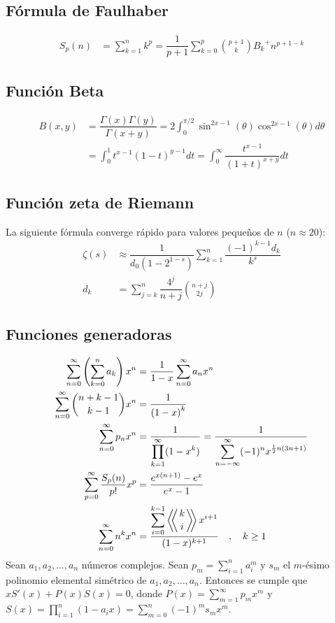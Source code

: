 	\subsection{Fórmula de Faulhaber}
		\begin{align*}
			S_p(n) &= \sum_{k=1}^{n}k^p = \dfrac{1}{p+1}\sum_{k=0}^{p} \binom{p+1}{k} {B_k}^+ n^{p+1-k}
		\end{align*}
	
	\subsection{Función Beta}
		\begin{align*}
			B(x,y) &= \dfrac{\Gamma(x)\Gamma(y)}{\Gamma(x+y)} = 2 \int_{0}^{\pi/2} \sin^{2x-1}(\theta) \cos^{2x-1}(\theta) d\theta \\
			&= \int_{0}^{1} t^{x-1} (1-t)^{y-1} dt = \int_{0}^{\infty} \dfrac{t^{x-1}}{(1+t)^{x+y}} dt
		\end{align*}
		
	\subsection{Función zeta de Riemann}
		La siguiente fórmula converge rápido para valores pequeños de $n$ ($n \approx 20$):
		\begin{align*}
			\zeta(s) &\approx \dfrac{1}{d_0 (1 - 2^{1-s})} \sum_{k=1}^{n} \dfrac{(-1)^{k-1} d_k}{k^s} \\
			d_k &= \sum_{j=k}^{n} \dfrac{4^j}{n+j} \binom{n+j}{2j}
		\end{align*}
	
	\subsection{Funciones generadoras}
		\begin{align*}
			\sum_{n=0}^{\infty} \left( \sum_{k=0}^{n}a_k \right) x^n &= \dfrac{1}{1-x}\sum_{n=0}^{\infty} a_n x^n \\
			\sum_{n=0}^{\infty} \binom{n+k-1}{k-1}x^n &= \dfrac{1}{\left(1-x\right)^k} \\
			\sum_{n=0}^{\infty} p_n x^n &= \dfrac{1}{\displaystyle \prod_{k=1}^{\infty}(1-x^k)} = \dfrac{1}{\displaystyle \sum_{n=-\infty}^{\infty} (-1)^n x^{\frac{1}{2}n(3n+1)}} \\
			\sum_{p=0}^{\infty} \dfrac{S_p(n)}{p!} x^p &= \dfrac{e^{x(n+1)}-e^x}{e^x-1} \\
			\sum_{n=0}^{\infty} n^k x^n &= \dfrac{\displaystyle \sum_{i=0}^{k-1} \left\langle\!\!\left\langle {k \atop i} \right\rangle\!\!\right\rangle x^{i+1}}{(1-x)^{k+1}} \quad , \quad k \geq 1
		\end{align*}
		Sean $a_1, a_2, \ldots, a_n$ números complejos. Sean $p_m = \displaystyle \sum_{i=1}^{n} a_i^m$ y $s_m$ el $m$-ésimo polinomio elemental simétrico de $a_1, a_2, \ldots, a_n$. Entonces se cumple que $xS'(x) + P(x)S(x) = 0$, donde $P(x)=\displaystyle \sum_{m=1}^{\infty} p_m x^m$ y $S(x)=\displaystyle \prod_{i=1}^{n}(1-a_ix) = \sum_{m=0}^{n}(-1)^m s_m x^m$.
	
